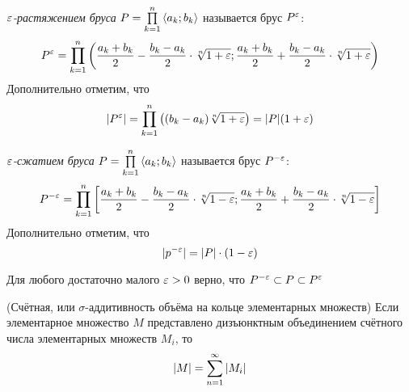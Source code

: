 \begin{definition}
	\textit{$\varepsilon$-растяжением бруса} $P = \prod\limits_{k = 1}^n \left\langle a_k; b_k\right\rangle$ называется брус $P^\varepsilon$:
	\[
		P^\varepsilon = \prod\limits_{k = 1}^n \left(\frac{a_k + b_k}{2} - \frac{b_k - a_k}{2} \cdot \sqrt[n]{1 + \varepsilon}; \frac{a_k + b_k}{2} + \frac{b_k - a_k}{2} \cdot \sqrt[n]{1 + \varepsilon}\right)
	\]
	Дополнительно отметим, что
	\[
		|P^\varepsilon| = \prod\limits_{k = 1}^n \big((b_k - a_k)\sqrt[n]{1 + \varepsilon}\big) = |P|(1 + \varepsilon)
	\]
\end{definition}

\begin{definition}
	\textit{$\varepsilon$-сжатием бруса} $P = \prod\limits_{k = 1}^n \left\langle a_k; b_k\right\rangle$ называется брус $P^{-\varepsilon}$:
	\[
		P^{-\varepsilon} = \prod\limits_{k = 1}^n \left[\frac{a_k + b_k}{2} - \frac{b_k - a_k}{2} \cdot \sqrt[n]{1 - \varepsilon}; \frac{a_k + b_k}{2} + \frac{b_k - a_k}{2} \cdot \sqrt[n]{1 - \varepsilon}\right]
	\]
	Дополнительно отметим, что
	\[
		|p^{-\varepsilon}| = |P| \cdot (1 - \varepsilon)
	\]
\end{definition}

\begin{note}
	Для любого достаточно малого $\varepsilon > 0$ верно, что $P^{-\varepsilon} \subset P \subset P^\varepsilon$
\end{note}

\begin{theorem} (Счётная, или $\sigma$-аддитивность объёма на кольце элементарных множеств)
	Если элементарное множество $M$ представлено дизъюнктным объединением счётного числа элементарных множеств $M_i$, то
	\[
		|M| = \sum_{n = 1}^\infty |M_i|
	\]
\end{theorem}

